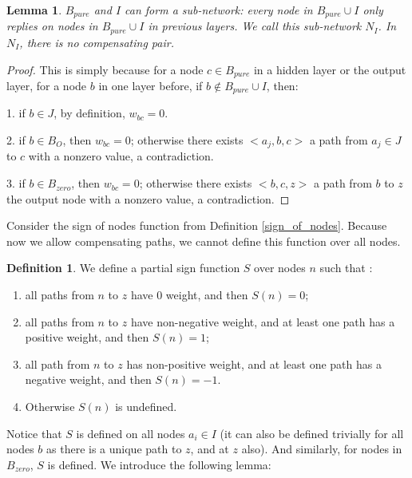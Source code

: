 \documentclass[]{article}
\newtheorem{lemma}{Lemma}
\theoremstyle{definition}
\newtheorem{definition}{Definition}
\begin{document}
\begin{lemma}\label{lem:subnetwork}
	$B_{pure}$ and $I$ can form a sub-network: every node in $B_{pure}\cup I$ only replies on nodes in $B_{pure}\cup I$ in previous layers. We call this sub-network $N_I$. In $N_I$, there is no compensating pair.
\end{lemma}

\begin{proof}
	This is simply because for a node $c\in B_{pure}$ in a hidden layer or the output layer, for a node $b$ in one layer before, if $b\notin B_{pure}\cup I$, then:
	
	1. if $b\in J$, by definition, $w_{bc}=0$.
	
	2. if $b\in B_{O}$, then $w_{bc}=0$; otherwise there exists $<a_j,b,c>$ a path from $a_j\in J$ to $c$ with a nonzero value, a contradiction.
	
	3. if $b\in B_{zero}$, then $w_{bc}=0$; otherwise there exists $<b,c,z>$ a path from $b$ to $z$ the output node with a nonzero value, a contradiction.
\end{proof}



Consider the sign of nodes function from Definition \ref{sign_of_nodes}. Because now we allow compensating paths, we cannot define this function over all nodes.




\begin{definition}\label{sign_of_nodes_in_I_2}
	We define a partial sign function $S$ over nodes $n$ such that : 	
	\begin{enumerate} 
		\item all paths from $n$ to $z$ have 0 weight, and then $S(n)=0$; 
		\item all paths from $n$ to $z$ have non-negative weight, and at least one path has a positive weight, and then $S(n)=1$; 
		\item all path from $n$ to $z$ has non-positive weight, and at least one path has a negative weight, and then $S(n)=-1$.
		\item Otherwise $S(n)$ is undefined.
	\end{enumerate}
\end{definition}	

Notice that $S$ is defined on all nodes $a_i \in I$ (it can also be defined trivially for all nodes $b$ as there is a unique path to $z$, and at $z$ also). And similarly, for nodes in  $B_{zero}$, $S$ is defined. We introduce the following lemma:
\end{document}
